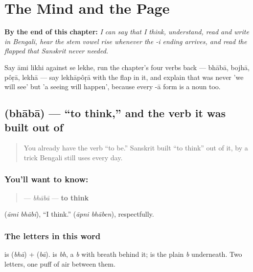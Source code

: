 
\chapter{The Mind and the Page}
\label{ch:bn-mind-and-page}

\begin{chapteropening}
\textbf{By the end of this chapter:} \emph{I can say that I think, understand, read and write in Bengali, hear the stem vowel rise whenever the -i ending arrives, and read the flapped  that Sanskrit never needed.}

Say āmi likhi against se lekhe, run the chapter's four verbs back — bhābā, bojhā, pôṛā, lekhā — say lekhāpôṛā with the flap in it, and explain that   was never 'we will see' but 'a seeing will happen', because every -ā form is a noun too.
\end{chapteropening}

\section[bhābā]{ (bhābā) — \textquotedblleft{}to think,\textquotedblright{} and the verb it was built out of}

\label{lesson:BN-C08-bhaba}



\begin{quote}
You already have the verb \textquotedblleft{}to be.\textquotedblright{} Sanskrit built \textquotedblleft{}to think\textquotedblright{} out of it, by a trick Bengali still uses every day.
\end{quote}

\subsection*{You'll want to know: }
\begin{quote}
\textbf{} — \emph{bhābā} — \textbf{to think}
\end{quote}

  (\emph{āmi bhābi}), \textquotedblleft{}I think.\textquotedblright{}   (\emph{āpni bhāben}), respectfully.

\subsection*{The letters in this word}
\textbf{} is \textbf{} (\emph{bhā}) + \textbf{} (\emph{bā}). \textbf{} is \emph{bh}, a \emph{b} with breath behind it; \textbf{} is the plain \emph{b} underneath. Two letters, one puff of air between them.

